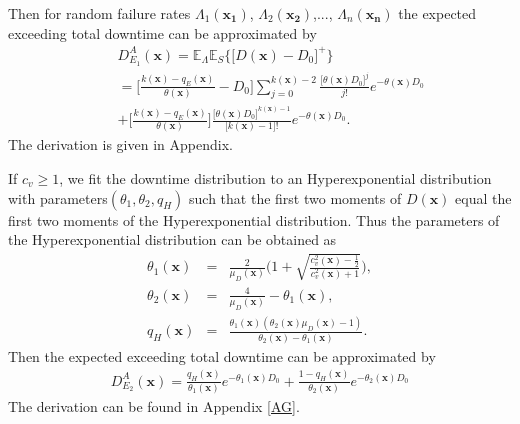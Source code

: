 \documentclass[preprint,12pt]{elsarticle}
\begin{document}
 Then for random failure rates $\Lambda_{1}(\boldsymbol{x_{1}})$, $\Lambda_{2}(\boldsymbol{x_{2}})$,..., $\Lambda_{n}(\boldsymbol{x_{n}})$ the expected exceeding total downtime can be approximated by
\begin{eqnarray}
&&D_{E_{1}}^{A}(\boldsymbol{x})=\mathbb{E}_{\Lambda}\mathbb{E}_{S}\bigg\{\big[D(\boldsymbol{x})-D_{0}\big]^{+}\bigg\} \nonumber\\
&&=\bigg[\frac{k(\boldsymbol{x})-q_{E}(\boldsymbol{x})}{\theta(\boldsymbol{x})}-D_{0}\bigg]\sum_{j=0}^{k(\boldsymbol{x})-2}{\frac{\big[\theta(\boldsymbol{x}) D_{0}\big]^j}{j!}e^{-\theta(\boldsymbol{x})D_{0}}}\nonumber\\
&&+\bigg[\frac{k(\boldsymbol{x})-q_{E}(\boldsymbol{x})}{\theta(\boldsymbol{x})}\bigg]\frac{\big[\theta(\boldsymbol{x})D_{0}\big]^{k(\boldsymbol{x})-1}}{\big[k(\boldsymbol{x})-1\big]!}e^{-\theta(\boldsymbol{x})D_{0}}.
\label{EXD1}
\end{eqnarray}
The derivation is given in Appendix.


If $c_{v} \geq 1$, we fit the downtime distribution to an Hyperexponential distribution with parameters$(\theta_{1},\theta_{2}, q_{H})$ such that the first two moments of $D(\boldsymbol{x})$ equal the first two moments of the Hyperexponential distribution. Thus the parameters of the Hyperexponential distribution can be obtained as
\begin{eqnarray}
     \theta_{1}(\boldsymbol{x}) &=& \frac{2}{\mu_{D}(\boldsymbol{x})}\bigg(1+\sqrt{\frac{c^{2}_{v}(\boldsymbol{x})-\frac{1}{2}}{c^{2}_{v}(\boldsymbol{x})+1}} \bigg), \label{theta11}\\
     \theta_{2}(\boldsymbol{x}) &=& \frac{4}{\mu_{D}(\boldsymbol{x})} - \theta_{1}(\boldsymbol{x}), \label{theta12}\\
     q_{H}(\boldsymbol{x}) &=& \frac{\theta_1(\boldsymbol{x})(\theta_2(\boldsymbol{x})\mu_{D}(\boldsymbol{x})-1)}{\theta_2(\boldsymbol{x}) -\theta_1(\boldsymbol{x})}. \label{q2}
\end{eqnarray}
Then the expected exceeding total downtime can be approximated by
\begin{eqnarray}
D_{E_{2}}^{A}(\boldsymbol{x}) =\frac{q_{H}(\boldsymbol{x})}{\theta_{1}(\boldsymbol{x})} e^{-\theta_{1}(\boldsymbol{x}) D_0 } + \frac{1-q_{H}(\boldsymbol{x})}{\theta_{2}(\boldsymbol{x})} e^{-\theta_{2}(\boldsymbol{x}) D_0} \label{EXD2}
\end{eqnarray}
The derivation can be found in Appendix \ref{AG}.
\end{document}
